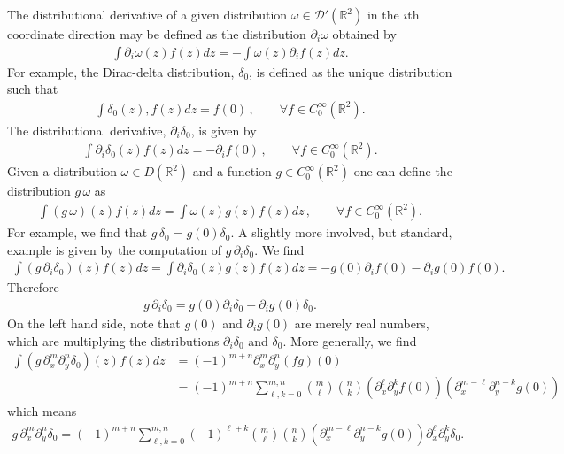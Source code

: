 \documentclass[12pt]{amsart}
\newcommand{\R}{\ensuremath{\mathbb{R}}}
\theoremstyle{remark}
\begin{document}
The distributional derivative of a given distribution $\omega \in \mathcal{D}'(\R^2)$ in the $i$th coordinate direction may be defined as the distribution $\partial_i \omega$ obtained by
\begin{align*}
	\int \partial_i \omega (z) f(z) dz = - \int \omega(z) \partial_i f (z) dz.
\end{align*}
For example, the Dirac-delta distribution, $\delta_0$, is defined as the unique distribution such that
\begin{align*}
	\int \delta_0(z) , f (z) dz = f(0) \,,\quad \quad \forall f \in C_0^\infty(\R^2).
\end{align*}
The distributional derivative, $\partial_i \delta_0$, is given by
\begin{align*}
	\int \partial_i \delta_0 (z) f(z) dz = -\partial_i f(0) \,,\quad \quad \forall f \in C_0^\infty(\R^2).
\end{align*}
Given a distribution $\omega \in D(\R^2)$ and a function $g \in C_0^\infty(\R^2)$ one can define the
distribution $g \, \omega$ as
\begin{align*}
	\int (g \, \omega)(z)  f(z) dz = \int \omega(z) g(z)f(z) dz \,,\quad \quad \forall f \in C_0^\infty(\R^2).
\end{align*}
For example, we find that $g \, \delta _0 = g(0) \delta_0$.
A slightly more involved, but standard,  example is given by the computation of $g\, \partial_i \delta_0$.
We find
\begin{align*}
	\int (g \, \partial_i \delta_0) (z)  f(z) dz = \int \partial_i \delta_0(z) g(z)f(z) dz =  - g(0) \partial_i f(0) - \partial_ig(0) f(0).
\end{align*}
Therefore
\begin{align*}
	g \, \partial_i \delta_0 = g(0) \partial_i \delta_0 - \partial_i g(0) \delta_0.
\end{align*}
On the left hand side, note that $g(0)$ and $\partial_i g(0)$ are merely real numbers,
which are multiplying the distributions $\partial_i \delta_0$ and $\delta_0$.
More generally, we find
\begin{align*}
	\int (g\, \partial_x^m \partial_y^n \delta_0)(z) f(z) dz &= (-1)^{m+n} \partial_x^m \partial_y^n (fg)(0) \\
		&= (-1)^{m+n} \sum_{\ell,k=0}^{m,n} \binom{m}{\ell} \binom{n}{k}
		\left(\partial_{x}^{\ell} \partial_y^k f(0) \right) 
		\left(\partial_{x}^{m-\ell} \partial_y^{n-k} g(0) \right) 
\end{align*}
which means
\begin{align}
	g \, \partial_x^m \partial_y^n \delta_0 =
		(-1)^{m+n} \sum_{\ell,k=0}^{m,n} (-1)^{\ell + k}
		\binom{m}{\ell} \binom{n}{k}
		\left(\partial_{x}^{m-\ell} \partial_y^{n-k} g(0) \right) 
		\partial_{x}^{\ell} \partial_y^k \delta_0.
                \label{eq:func times partial delta}
\end{align}
\end{document}
